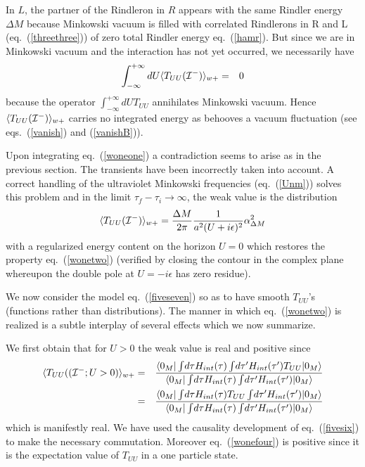 \documentclass[12pt,oneside]{report}
\def\elematrice#1#2#3{\langle #1|#2|#3 \rangle}
\begin{document}
In $L$, the partner of the Rindleron in $R$ appears with the same Rindler energy
$\Delta M$ because Minkowski vacuum is filled with correlated Rindlerons
in R and L (eq.~(\ref{threethree})) of zero total Rindler energy
eq.~(\ref{hamr}). But since we are in Minkowski vacuum and the interaction has
not yet occurred, we necessarily have \begin{eqnarray}
\int_{-\infty}^{+\infty} dU \langle T_{UU}({\cal{I^-}}) \rangle_{w+} &=&
0\label{wonetwo}
\end{eqnarray}
because  the operator $\int_{-\infty}^{+\infty} dU T_{UU}$ annihilates  
Minkowski vacuum.  Hence \break $\langle T_{UU}({\cal{I^-}})
\rangle_{w+}$
 carries no integrated energy as behooves a vacuum fluctuation
(see eqs.~(\ref{vanish}) and (\ref{vanishB})).

Upon integrating eq.~(\ref{woneone}) a contradiction
seems to arise as in the previous section. The transients have been
incorrectly taken into account. A correct handling of the ultraviolet
Minkowski frequencies (eq.~(\ref{Unm})) solves this problem and 
in the limit $\tau_f - \tau_i \to \infty$, the weak value is the distribution
\begin{equation} \langle T_{UU}({\cal{I^-}}) \rangle_{w+} = {\Delta M \over 2\pi}{1 \over
a^2 (U+i\epsilon)^2} \alpha_{\Delta M}^2 \label{wonethree}
\end{equation}
with a regularized energy content on the horizon $U=0$ which restores the
property eq.~(\ref{wonetwo}) (verified by closing the contour in the complex
plane whereupon the double pole at $U=-i\epsilon$ has zero residue).

We now consider the model eq.~(\ref{fiveseven}) so as to have smooth $T_{UU}$'s
(functions rather than distributions). 
The manner in which eq.~(\ref{wonetwo}) is realized is a subtle interplay of
several effects which we now summarize.

We first obtain that for $U>0$ the weak value is real and positive since
\begin{eqnarray}
\langle T_{UU}(({\cal{I^-}};U>0) \rangle_{w+} &=&{ \elematrice{0_M}{
\int \! d\tau H_{int}(\tau) \int\! d\tau^\prime H_{int}(\tau^\prime)
T_{UU} }{0_M} \over \elematrice{0_M}{
\int \! d\tau H_{int}(\tau) \int\! d\tau^\prime H_{int}(\tau^\prime)}
{0_M}}\nonumber\\
\ &=& {
\elematrice{0_M}{
\int \! d\tau H_{int}(\tau)  
T_{UU}
\int\! d\tau^\prime H_{int}(\tau^\prime)
 }{0_M} \over \elematrice{0_M}{
\int \! d\tau H_{int}(\tau) \int\! d\tau^\prime H_{int}(\tau^\prime)}
{0_M}}
\label{wonefour}
\end{eqnarray}
which is manifestly real. We have used the causality development of 
eq.~(\ref{fivesix}) to make the necessary commutation. Moreover 
eq.~(\ref{wonefour})
is positive since it is the expectation value of $T_{UU}$ in a one particle
state. 
\end{document}
